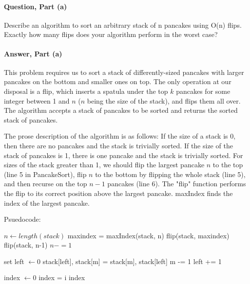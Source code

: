 \documentclass{article}
\begin{document}
\paragraph{Question, Part (a)}{Describe an algorithm to sort an arbitrary stack of n pancakes using O(n) flips. Exactly how many flips does your algorithm perform in the worst case?}
\paragraph{Answer, Part (a)}{This problem requires us to sort a stack of differently-sized pancakes with larger pancakes on the bottom and smaller ones on top. The only operation at our disposal is a flip, which inserts a spatula under the top $k$ pancakes for some integer between 1 and $n$ ($n$ being the size of the stack), and flips them all over. The algorithm accepts a stack of pancakes to be sorted and returns the sorted stack  of pancakes.

The prose description of the algorithm is as follows: If the size of a stack is 0, then there are no pancakes and the stack is trivially sorted. If the size of the stack of pancakes is 1, there is one pancake and the stack is trivially sorted. For sizes of the stack greater than 1, we should flip the largest pancake $n$ to the top (line 5 in PancakeSort), flip $n$ to the bottom by flipping the whole stack (line 5), and then recurse on the top $n-1$ pancakes (line 6). The "flip" function performs the flip to its correct position above the largest pancake. maxIndex finds the index of the largest pancake. 

Psuedocode:
\begin{algorithmic}
\State $n\gets length(stack)$
	\State maxindex = maxIndex(stack, n)
	\State flip(stack, maxindex)
	\State flip(stack, n-1)
	\State $n -= 1$
\EndWhile
\EndFunction
\end{algorithmic}

\begin{algorithmic}
\State set left $\gets 0$
	stack[left], stack[m] = stack[m], stack[left]
	m -= 1
	left += 1
\EndWhile
\EndFunction
\end{algorithmic}
\begin{algorithmic}
\State index $\gets 0$
		\State index = i
	\EndIf
\EndFor
\Return index
\EndFunction
\end{algorithmic}

}
\end{document}
